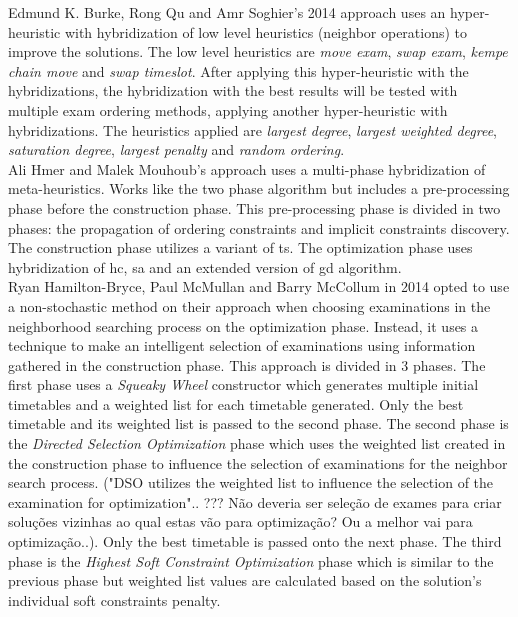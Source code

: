Edmund K. Burke, Rong Qu and Amr Soghier's 2014 approach \cite{Burke2014} uses an hyper-heuristic with hybridization of low level heuristics (neighbor operations) to improve the solutions. The low level heuristics are \textit{move exam}, \textit{swap exam}, \textit{kempe chain move} and \textit{swap timeslot}. After applying this hyper-heuristic with the hybridizations, the hybridization with the best results will be tested with multiple exam ordering methods, applying another hyper-heuristic with hybridizations. The heuristics applied are \textit{largest degree}, \textit{largest weighted degree}, \textit{saturation degree}, \textit{largest penalty} and \textit{random ordering}.\\

Ali Hmer and Malek Mouhoub's approach \cite{Mouhoub2014} uses a multi-phase hybridization of meta-heuristics. Works like the two phase algorithm but includes a pre-processing phase before the construction phase. This pre-processing phase is divided in two phases: the propagation of ordering constraints and implicit constraints discovery. The construction phase utilizes a variant of \gls{ts}. The optimization phase uses hybridization of \gls{hc}, \gls{sa} and an extended version of \gls{gd} algorithm.\\

Ryan Hamilton-Bryce, Paul McMullan and Barry McCollum in 2014 opted to use a non-stochastic method on their approach \cite{Hamilton-Bryce2014} when choosing examinations in the neighborhood searching process on the optimization phase. Instead, it uses a technique to make an intelligent selection of examinations using information gathered in the construction phase. This approach is divided in 3 phases. The first phase uses a \textit{Squeaky Wheel} constructor which generates multiple initial timetables and a weighted list for each timetable generated. Only the best timetable and its weighted list is passed to the second phase. The second phase is the \textit{Directed Selection Optimization} phase which uses the weighted list created in the construction phase to influence the selection of examinations for the neighbor search process. {\color{red} ("DSO utilizes the weighted list to influence the selection of the examination for optimization".. ??? Não deveria ser seleção de exames para criar soluções vizinhas ao qual estas vão para optimização? Ou a melhor vai para optimização..)}. Only the best timetable is passed onto the next phase. The third phase is the \textit{Highest Soft Constraint Optimization} phase which is similar to the previous phase but weighted list values are calculated based on the solution's individual soft constraints penalty.\\

